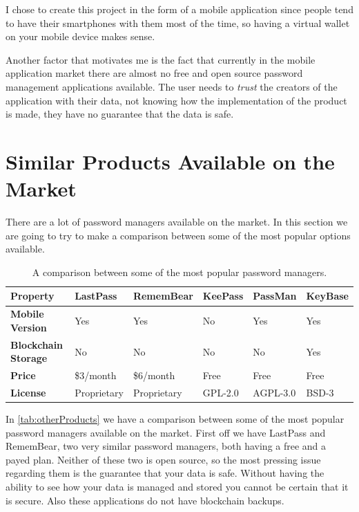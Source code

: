 \documentclass[a4paper,12pt]{report}
\begin{document}
I chose to create this project in the form of a mobile application since people
tend to have their smartphones with them most of the time, so having a virtual
wallet on your mobile device makes sense.

Another factor that motivates me is the fact that currently in the mobile
application market there are almost no free and open source password management
applications available. The user needs to \textit{trust} the creators of the
application with their data, not knowing how the implementation of the product
is made, they have no guarantee that the data is safe.

\section{Similar Products Available on the Market}

There are a lot of password managers available on the market. In this section
we are going to try to make a comparison between some of the most popular
options available.

\begin{table}[h!]
    \centering
    \begin{tabular}{ | l | l | l | l | l | l | }
        \hline
        \textbf{Property}           & \textbf{LastPass} & \textbf{RememBear} & \textbf{KeePass} & \textbf{PassMan} & \textbf{KeyBase} \\
        \hline
        \textbf{Mobile Version}     & Yes               & Yes                & No               & Yes              & Yes              \\
        \hline
        \textbf{Blockchain Storage} & No                & No                 & No               & No               & Yes              \\
        \hline
        \textbf{Price}              & \$3/month         & \$6/month          & Free             & Free             & Free             \\
        \hline
        \textbf{License}            & Proprietary       & Proprietary        & GPL-2.0          & AGPL-3.0         & BSD-3            \\
        \hline
    \end{tabular}
    \caption{A comparison between some of the most popular password managers.}\label{tab:otherProducts}
\end{table}

In \autoref{tab:otherProducts} we have a comparison between some of the most
popular password managers available on the market. First off we have
LastPass\cite{lastpass} and RememBear\cite{remembear}, two very similar
password managers, both having a free and a payed plan. Neither of these two is
open source, so the most pressing issue regarding them is the guarantee that
your data is safe. Without having the ability to see how your data is managed
and stored you cannot be certain that it is secure. Also these applications do
not have blockchain backups.
\end{document}
